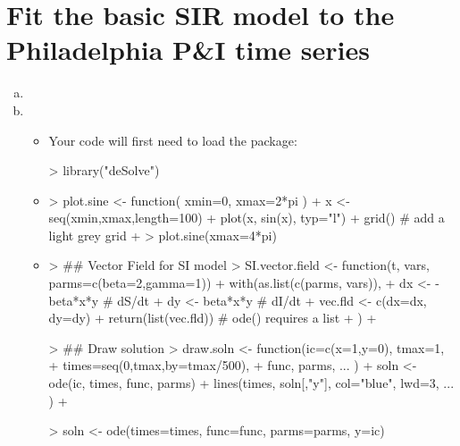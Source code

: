 \documentclass[12pt]{article}
\begin{document}
\section{Fit the basic SIR model to the Philadelphia P\&I time series}

\begin{enumerate}[(a)]

\item \FitSIRa

\item \FitSIRbIntro
\begin{itemize}
    \item Your code will first need to load the  package:
\begin{Schunk}
\begin{Sinput}
> library("deSolve")
\end{Sinput}
\end{Schunk}
    \item \FitSIRbii
\begin{Schunk}
\begin{Sinput}
> plot.sine <- function( xmin=0, xmax=2*pi ) {
+   x <- seq(xmin,xmax,length=100)
+   plot(x, sin(x), typ="l")
+   grid() # add a light grey grid
+ }
> plot.sine(xmax=4*pi)
\end{Sinput}
\end{Schunk}
  \item \FitSIRbiiiA
\begin{Schunk}
\begin{Sinput}
> ## Vector Field for SI model
> SI.vector.field <- function(t, vars, parms=c(beta=2,gamma=1)) {
+   with(as.list(c(parms, vars)), {
+     dx <- -beta*x*y # dS/dt
+     dy <- beta*x*y  # dI/dt
+     vec.fld <- c(dx=dx, dy=dy)
+     return(list(vec.fld)) # ode() requires a list
+   })
+ }
\end{Sinput}
\end{Schunk}

\FitSIRbiiiB
\begin{Schunk}
\begin{Sinput}
> ## Draw solution
> draw.soln <- function(ic=c(x=1,y=0), tmax=1, 
+                       times=seq(0,tmax,by=tmax/500), 
+                       func, parms, ... ) {
+   soln <- ode(ic, times, func, parms)
+   lines(times, soln[,"y"], col="blue", lwd=3, ... )
+ }
\end{Sinput}
\end{Schunk}
\FitSIRbiiiC
\begin{Schunk}
\begin{Sinput}
>   soln <- ode(times=times, func=func, parms=parms, y=ic)
\end{Sinput}
\end{Schunk}


\end{itemize}
\end{enumerate}
\end{document}
